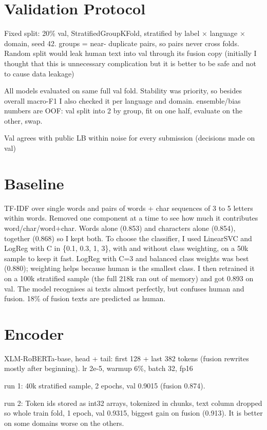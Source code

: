 \documentclass[10pt,a4paper]{article}
\begin{document}
\section{Validation Protocol}
Fixed split: 20\% val, StratifiedGroupKFold, stratified by label $\times$ language $\times$ domain, seed 42. groups = near-
duplicate pairs, so pairs never cross folds. Random split would leak human text into val through its fusion copy (initially 
I thought that this is unnecessary complication but it is better to be safe and not to cause data leakage)

All models evaluated on same full val fold. Stability was priority, so besides overall macro-F1 I also checked it per language and domain.
ensemble/bias numbers are OOF: val split into 2 by group, fit on one half, evaluate on the other, swap.

Val agrees with public LB within noise for every submission (decisions made on val)

\section{Baseline}
TF-IDF over single words and pairs of words + char sequences of 3 to 5 letters within words. Removed one component 
at a time to see how much it contributes word/char/word+char. Words alone (0.853) and characters alone (0.854), 
together (0.868) so I kept both. To choose the classifier, I used LinearSVC and LogReg with C in \{0.1, 0.3, 1, 3\},
with and without class weighting, on a 50k sample to keep it fast. LogReg with C=3 and balanced class weights was best (0.880); weighting helps because human is the smallest class.
I then retrained it on a 100k stratified sample (the full 218k ran out of memory) and got 0.893 on val.
The model recognises ai texts almost perfectly, but confuses human and fusion. 18\% of fusion texts are predicted as human. 

\section{Encoder}
XLM-RoBERTa-base, head + tail: first 128 + last 382 tokens (fusion rewrites mostly after beginning). lr 2e-5, warmup 6\%, batch 32, fp16

\noindent run 1: 40k stratified sample, 2 epochs, val 0.9015 (fusion 0.874).

\noindent run 2: Token ids stored as int32 arrays, tokenized in chunks, text column dropped so whole train fold, 1 epoch, val 0.9315, 
biggest gain on fusion (0.913). It is better on some domains worse on the others.
\end{document}
